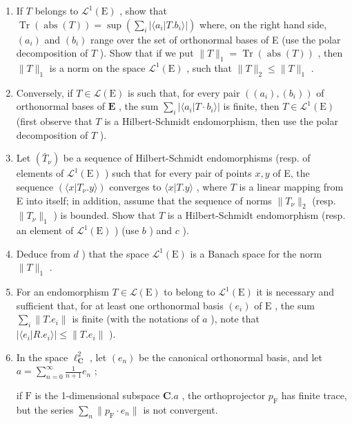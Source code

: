 \begin{enumerate}
\def\labelenumi{\alph{enumi})}
\setcounter{enumi}{1}
\item
  If \(T\) belongs to \(\mathcal{L}^1 (\mathrm{E})\) , show that \(\operatorname {Tr}(\operatorname {abs}(T)) = \sup (\sum_i |\langle a_i | T.b_i\rangle |)\) where, on the right hand side, \((a_{i})\) and \((b_{i})\) range over the set of orthonormal bases of E (use the polar decomposition of \(T\) ). Show that if we put \(\| T\| _1 = \operatorname {Tr}(\operatorname {abs}(T))\) , then \(\| T\| _1\) is a norm on the space \(\mathcal{L}^1 (\mathrm{E})\) , such that \(\| T\| _2\leqslant \| T\| _1\) .
\item
  Conversely, if \(T \in \mathcal{L}(\mathrm{E})\) is such that, for every pair \(((a_i), (b_i))\) of orthonormal bases of \(\mathbf{E}\) , the sum \(\sum_{i} |\langle a_i | T \cdot b_i \rangle|\) is finite, then \(T \in \mathcal{L}^1(\mathrm{E})\) (first observe that \(T\) is a Hilbert-Schmidt endomorphism, then use the polar decomposition of \(T\) ).
\item
  Let \((\bar{T}_{\nu})\) be a sequence of Hilbert-Schmidt endomorphisms (resp. of elements of \(\mathcal{L}^1 (\mathrm{E})\) ) such that for every pair of points \(x,y\) of E, the sequence \((\langle x|T_{\nu}.y\rangle)\) converges to \(\langle x|T.y\rangle\) , where \(T\) is a linear mapping from E into itself; in addition, assume that the sequence of norms \(\| T_{\nu}\| _2\) (resp. \(\| T_{\nu}\| _1\) ) is bounded. Show that \(T\) is a Hilbert-Schmidt endomorphism (resp. an element of \(\mathcal{L}^1 (\mathrm{E})\) ) (use \(b\) ) and \(c\) ).
\item
  Deduce from \(d\) ) that the space \(\mathcal{L}^1 (\mathrm{E})\) is a Banach space for the norm \(\| T\| _1\) .
\item
  For an endomorphism \(T \in \mathcal{L}(\mathrm{E})\) to belong to \(\mathcal{L}^1(\mathrm{E})\) it is necessary and sufficient that, for at least one orthonormal basis \((e_i)\) of \(\mathrm{E}\) , the sum \(\sum_{i} \| T.e_i\|\) is finite (with the notations of \(a\) ), note that \(|\langle e_i|R.e_i\rangle| \leqslant \| T.e_i\|\) ).

\item
  In the space \(\ell_{\mathbf{C}}^2\) , let \((e_n)\) be the canonical orthonormal basis, and let \(a = \sum_{n=0}^{\infty} \frac{1}{n+1} e_n\) ;

if \(\mathrm{F}\) is the 1-dimensional subspace \(\mathbf{C}.a\) , the orthoprojector \(p_{\mathrm{F}}\) has finite trace, but the series \(\sum_{n}\| p_{\mathrm{F}}\cdot e_n\|\) is not convergent.
\end{enumerate}

